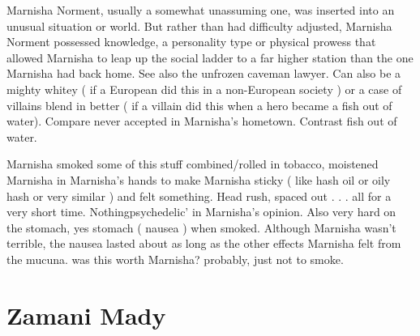 \documentclass[12pt]{book}
\begin{document}
Marnisha Norment, usually a somewhat unassuming one, was inserted into an unusual situation or world. But rather than had difficulty adjusted, Marnisha Norment possessed knowledge, a personality type or physical prowess that allowed Marnisha to leap up the social ladder to a far higher station than the one Marnisha had back home. See also the unfrozen caveman lawyer. Can also be a mighty whitey ( if a European did this in a non-European society ) or a case of villains blend in better ( if a villain did this when a hero became a fish out of water). Compare never accepted in Marnisha's hometown. Contrast fish out of water.



Marnisha smoked some of this stuff combined/rolled in tobacco, moistened Marnisha in Marnisha's hands to make Marnisha sticky ( like hash oil or oily hash or very similar ) and felt something. Head rush, spaced out . . .  all for a very short time. Nothingpsychedelic' in Marnisha's opinion. Also very hard on the stomach, yes stomach ( nausea ) when smoked. Although Marnisha wasn't terrible, the nausea lasted about as long as the other effects Marnisha felt from the mucuna. was this worth Marnisha? probably, just not to smoke.



\chapter{Zamani Mady}
\end{document}
